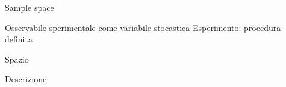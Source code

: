 
\begin{frame}{Sample space}
\begin{block}{Osservabile sperimentale come variabile stocastica}
Esperimento: procedura definita
\end{block}

\begin{block}{Spazio }

\end{block}

\end{frame}

\begin{wordonframe}{Descrizione}



\end{wordonframe}